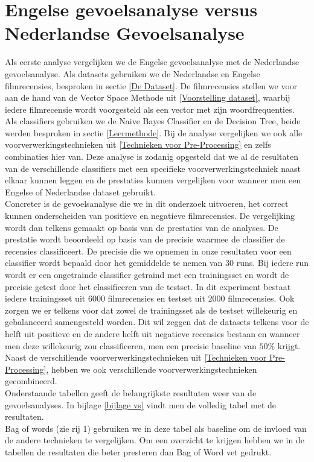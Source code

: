\section{Engelse gevoelsanalyse versus Nederlandse Gevoelsanalyse}\label{Engelse gevoelsanalyse versus Nederlandse Gevoelsanalyse}

Als eerste analyse vergelijken we de Engelse gevoelsanalyse met de Nederlandse gevoelsanalyse. Als datasets gebruiken we de Nederlandse en Engelse filmrecensies, besproken in sectie \ref{De Dataset}. De filmrecensies stellen we voor aan de hand van de Vector Space Methode uit \ref{Voorstelling dataset}, waarbij iedere filmrecensie wordt voorgesteld als een vector met zijn woordfrequenties. Als classifiers gebruiken we de Naive Bayes Classifier en de Decision Tree, beide werden besproken in sectie \ref{Leermethode}. Bij de analyse vergelijken we ook alle voorverwerkingstechnieken uit \ref{Technieken voor Pre-Processing} en zelfs combinaties hier van. Deze analyse is zodanig opgesteld dat we al de resultaten van de verschillende classifiers met een specifieke voorverwerkingstechniek naast elkaar kunnen leggen en de prestaties kunnen vergelijken voor wanneer men een Engelse of Nederlandse dataset gebruikt.\\

Concreter is de gevoelsanalyse die we in dit onderzoek uitvoeren, het correct kunnen onderscheiden van positieve en negatieve filmrecensies. De vergelijking wordt dan telkens gemaakt op basis van de prestaties van de analyses. De prestatie wordt beoordeeld op basis van de precisie waarmee de classifier de recensies classificeert. De precisie die we opnemen in onze resultaten voor een classifier wordt bepaald door het gemiddelde te nemen van 30 runs. Bij iedere run wordt er een ongetrainde classifier getraind met een trainingsset en wordt de precisie getest door het classificeren van de testset. In dit experiment bestaat iedere trainingsset uit 6000 filmrecensies en testset uit 2000 filmrecensies. Ook zorgen we er telkens voor dat zowel de trainingsset als de testset willekeurig en gebalanceerd samengesteld worden. Dit wil zeggen dat de datasets telkens voor de helft uit positieve en de andere helft uit negatieve recensies bestaan en wanneer men deze willekeurig zou classificeren, men een precisie baseline van $50\%$ krijgt.\\

Naast de verschillende voorverwerkingstechnieken uit \ref{Technieken voor Pre-Processing}, hebben we ook verschillende voorverwerkingstechnieken gecombineerd.\\
Onderstaande tabellen geeft de belangrijkste resultaten weer van de gevoelsanalyses. In bijlage \ref{bijlage vs} vindt men de volledig tabel met de resultaten. \\ 
Bag of words (zie rij 1) gebruiken we in deze tabel als baseline om de invloed van de andere technieken te vergelijken. Om een overzicht te krijgen hebben we in de tabellen de resultaten die beter presteren dan Bag of Word vet gedrukt. 

